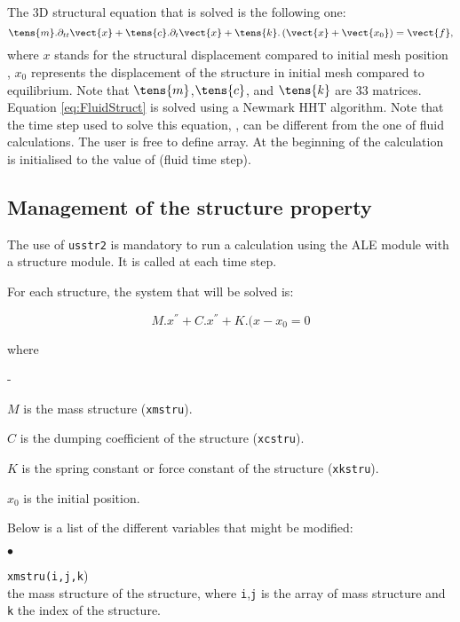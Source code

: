 {The 3D structural equation that is solved is the following one:
\begin{equation}\label{eq:FluidStruct}
\displaystyle
\tens{m}.\partial_{tt}\vect{x}+\tens{c}.\partial_{t}\vect{x}+\tens{k}.\left(\vect{x}+\vect{x_0}\right)=\vect{f},
\end{equation}
where $x$ stands for the structural displacement compared to initial mesh position
 , $x_0$ represents
 the displacement of the structure in initial mesh compared to equilibrium.
Note that $\tens{m}$,$\tens{c}$, and $\tens{k}$ are 33 matrices.
Equation \eqref{eq:FluidStruct} is solved using a Newmark HHT algorithm.
Note that the time step used to solve this equation, , can be
 different from the one of fluid calculations. The user is free to define 
 array. At the beginning of the calculation  is initialised to the value of
  (fluid time step).

\subsection{Management of the structure property}

The use of \texttt{usstr2} is mandatory to run a calculation using the ALE
 module with a structure module. It is called at each time step.

For each structure, the system that will be solved is:

\begin{equation}
M.x^{''}+C.x^{''}+K.(x-x_{0} = 0
\end{equation}

where

\begin{list}{-}{}
 \item $M$ is the mass structure (\texttt{xmstru}).
 \item $C$ is the dumping coefficient of the structure (\texttt{xcstru}).
 \item $K$ is the spring constant or force constant of the structure (\texttt{xkstru}).
 \item $x_{0}$ is the initial position.
\end{list}

Below is a list of the different variables that might be modified:

\begin{list}{$\bullet$}{}

\item{\texttt{xmstru(i,j,k})} \\
{the mass structure of the structure, where \texttt{i},\texttt{j} is
the array of mass structure and \texttt{k} the index of the structure.}


\end{list}}
